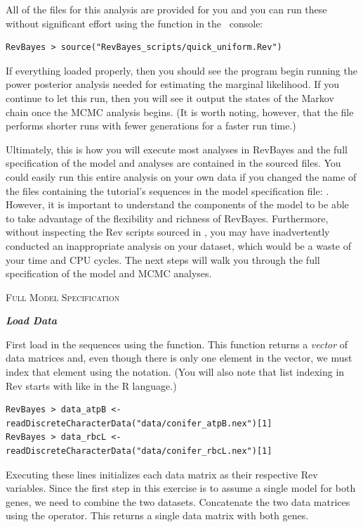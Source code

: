 All of the files for this analysis are provided for you and you can run these without significant effort using the  function in the \RevBayes~console:
{\tt \begin{snugshade*}
\begin{lstlisting}
RevBayes > source("RevBayes_scripts/quick_uniform.Rev")
\end{lstlisting}
\end{snugshade*}}

If everything loaded properly, then you should see the program begin running the power posterior analysis needed for estimating the marginal likelihood. If you continue to let this run, then you will see it output the states of the Markov chain once the MCMC analysis begins. (It is worth noting, however, that the file  performs shorter runs with fewer generations for a faster run time.)

Ultimately, this is how you will execute most analyses in RevBayes and the full specification of the model and analyses are contained in the sourced files. 
You could easily run this entire analysis on your own data if you changed the name of the files containing the tutorial's sequences in the model specification file: . 
However, it is important to understand the components of the model to be able to take advantage of the flexibility and richness of RevBayes.
Furthermore, without inspecting the Rev scripts sourced in , you may have inadvertently conducted an inappropriate analysis on your dataset, which would be a waste of your time and CPU cycles. 
The next steps will walk you through the full specification of the model and MCMC analyses. 

\bigskip
{\large \textcolor{mycol}{\textsc{Full Model Specification}}}

\textbf{\textit{Load Data}}

First load in the sequences using the  function. This function returns a \textit{vector} of data matrices and, even though there is only one element in the vector, we must index that element using the \cl{[1]} notation. (You will also note that list indexing in Rev starts with  like in the R language.)
{\tt \begin{snugshade*}
\begin{lstlisting}
RevBayes > data_atpB <- readDiscreteCharacterData("data/conifer_atpB.nex")[1]
RevBayes > data_rbcL <- readDiscreteCharacterData("data/conifer_rbcL.nex")[1]
\end{lstlisting}
\end{snugshade*}}
Executing these lines initializes each data matrix as their respective Rev variables. 
Since the first step in this exercise is to assume a single model for both genes, we need to combine the two datasets.
Concatenate the two data matrices using the \cl{+} operator. This returns a single data matrix with both genes.

